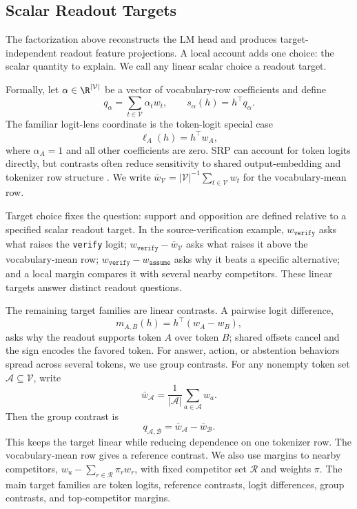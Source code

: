 \subsection{Scalar Readout Targets}
\label{sec:problem-setup}

The factorization above reconstructs the LM head and produces target-independent
readout feature projections. A local account adds one choice: the scalar
quantity to explain. We call any linear scalar choice a readout target.

Formally, let \(\alpha\in\R^{|\mathcal{V}|}\) be a vector of vocabulary-row
coefficients and define
\[
    q_\alpha = \sum_{t\in\mathcal{V}} \alpha_t w_t,
    \qquad
    s_\alpha(h)=h^\top q_\alpha .
\]
The familiar logit-lens coordinate is the token-logit special case
\[
    \ell_A(h)=h^\top w_A,
\]
where \(\alpha_A=1\) and all other coefficients are zero. SRP can account for
token logits directly, but contrasts often reduce sensitivity to shared
output-embedding and tokenizer row structure
\citep{press2017outputembedding,inan2017tying,yang2018softmaxbottleneck,bostrom2020bpe}.
We write
\(\bar{w}_{\mathcal{V}}=|\mathcal{V}|^{-1}\sum_{t\in\mathcal{V}}w_t\) for the
vocabulary-mean row.

Target choice fixes the question: support and opposition are defined relative to
a specified scalar readout target. In the source-verification example,
\(w_{\texttt{verify}}\) asks what raises the \texttt{verify} logit;
\(w_{\texttt{verify}}-\bar{w}_{\mathcal{V}}\) asks what raises it above
the vocabulary-mean row; \(w_{\texttt{verify}}-w_{\texttt{assume}}\) asks why it
beats a specific alternative; and a local margin compares it with several nearby
competitors. These linear targets answer distinct readout questions.

The remaining target families are linear contrasts. A pairwise logit difference,
\[
    m_{A,B}(h)=h^\top(w_A-w_B),
\]
asks why the readout supports token \(A\) over token \(B\); shared offsets cancel
and the sign encodes the favored token. For answer, action, or abstention
behaviors spread across several tokens, we use group contrasts. For any nonempty
token set \(\mathcal{A}\subseteq\mathcal{V}\), write
\[
    \bar{w}_{\mathcal{A}}
    =
    \frac{1}{|\mathcal{A}|}\sum_{a\in\mathcal{A}}w_a .
\]
Then the group contrast is
\[
    q_{\mathcal{A},\mathcal{B}}
    =
    \bar{w}_{\mathcal{A}}-\bar{w}_{\mathcal{B}} .
\]
This keeps the target linear while reducing dependence on one tokenizer row. The
vocabulary-mean row gives a reference contrast. We also use margins to nearby
competitors, \(w_u-\sum_{r\in\mathcal{R}}\pi_r w_r\), with fixed competitor set
\(\mathcal{R}\) and weights \(\pi\). The main target families are token logits,
reference contrasts, logit differences, group contrasts, and top-competitor
margins.


